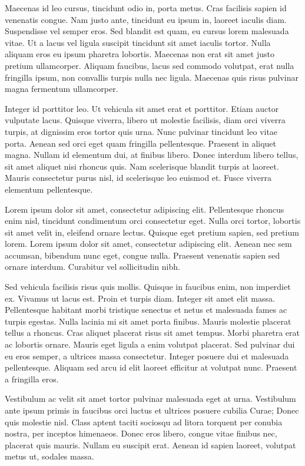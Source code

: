 Maecenas id leo cursus, tincidunt odio in, porta metus. Cras facilisis sapien id venenatis congue. Nam justo ante, tincidunt eu ipsum in, laoreet iaculis diam. Suspendisse vel semper eros. Sed blandit est quam, eu cursus lorem malesuada vitae. Ut a lacus vel ligula suscipit tincidunt sit amet iaculis tortor. Nulla aliquam eros eu ipsum pharetra lobortis. Maecenas non erat sit amet justo pretium ullamcorper. Aliquam faucibus, lacus sed commodo volutpat, erat nulla fringilla ipsum, non convallis turpis nulla nec ligula. Maecenas quis risus pulvinar magna fermentum ullamcorper.

Integer id porttitor leo. Ut vehicula sit amet erat et porttitor. Etiam auctor vulputate lacus. Quisque viverra, libero ut molestie facilisis, diam orci viverra turpis, at dignissim eros tortor quis urna. Nunc pulvinar tincidunt leo vitae porta. Aenean sed orci eget quam fringilla pellentesque. Praesent in aliquet magna. Nullam id elementum dui, at finibus libero. Donec interdum libero tellus, sit amet aliquet nisi rhoncus quis. Nam scelerisque blandit turpis at laoreet. Mauris consectetur purus nisl, id scelerisque leo euismod et. Fusce viverra elementum pellentesque. 


Lorem ipsum dolor sit amet, consectetur adipiscing elit. Pellentesque rhoncus enim nisl, tincidunt condimentum orci consectetur eget. Nulla orci tortor, lobortis sit amet velit in, eleifend ornare lectus. Quisque eget pretium sapien, sed pretium lorem. Lorem ipsum dolor sit amet, consectetur adipiscing elit. Aenean nec sem accumsan, bibendum nunc eget, congue nulla. Praesent venenatis sapien sed ornare interdum. Curabitur vel sollicitudin nibh.

Sed vehicula facilisis risus quis mollis. Quisque in faucibus enim, non imperdiet ex. Vivamus ut lacus est. Proin et turpis diam. Integer sit amet elit massa. Pellentesque habitant morbi tristique senectus et netus et malesuada fames ac turpis egestas. Nulla lacinia mi sit amet porta finibus. Mauris molestie placerat tellus a rhoncus. Cras aliquet placerat risus sit amet tempus. Morbi pharetra erat ac lobortis ornare. Mauris eget ligula a enim volutpat placerat. Sed pulvinar dui eu eros semper, a ultrices massa consectetur. Integer posuere dui et malesuada pellentesque. Aliquam sed arcu id elit laoreet efficitur at volutpat nunc. Praesent a fringilla eros.

Vestibulum ac velit sit amet tortor pulvinar malesuada eget at urna. Vestibulum ante ipsum primis in faucibus orci luctus et ultrices posuere cubilia Curae; Donec quis molestie nisl. Class aptent taciti sociosqu ad litora torquent per conubia nostra, per inceptos himenaeos. Donec eros libero, congue vitae finibus nec, placerat quis mauris. Nullam eu suscipit erat. Aenean id sapien laoreet, volutpat metus ut, sodales massa.

